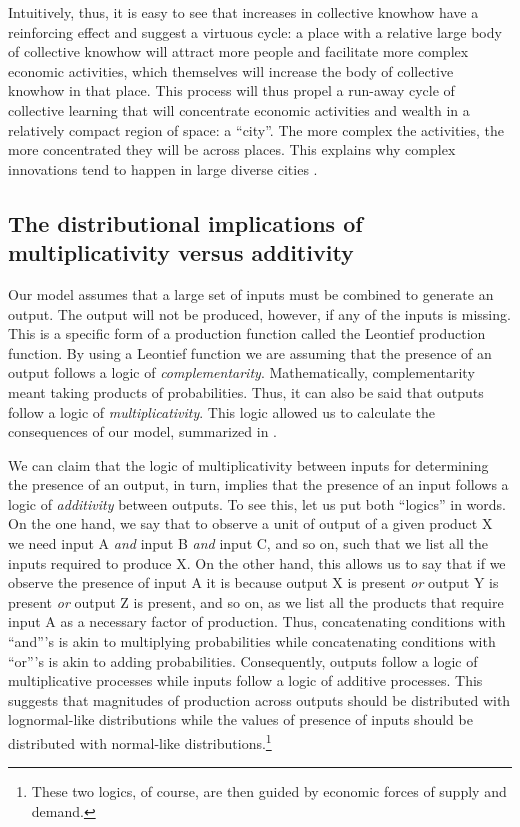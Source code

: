 \documentclass[12pt]{article}
\begin{document}
Intuitively, thus, it is easy to see that increases in collective knowhow have a reinforcing effect and suggest a virtuous cycle: a place with a relative large body of collective knowhow will attract more people and facilitate more complex economic activities, which themselves will increase the body of collective knowhow in that place. This process will thus propel a run-away cycle of collective learning that will concentrate economic activities and wealth in a relatively compact region of space: a ``city''. The more complex the activities, the more concentrated they will be across places. This explains why complex innovations tend to happen in large diverse cities \citep{gomez2016explaining}.


\subsection{The distributional implications of multiplicativity versus additivity}\label{sec_multadd}
Our model assumes that a large set of inputs must be combined to generate an output. The output will not be produced, however, if any of the inputs is missing. This is a specific form of a production function called the Leontief production function. By using a Leontief function we are assuming that the presence of an output follows a logic of \emph{complementarity}. Mathematically, complementarity meant taking products of probabilities. Thus, it can also be said that outputs follow a logic of \emph{multiplicativity}. This logic allowed us to calculate the consequences of our model, summarized in .

We can claim that the logic of multiplicativity between inputs for determining the presence of an output, in turn, implies that the presence of an input follows a logic of \emph{additivity} between outputs. To see this, let us put both ``logics'' in words. On the one hand, we say that to observe a unit of output of a given product X we need input A \emph{and} input B \emph{and} input C, and so on, such that we list all the inputs required to produce X. On the other hand, this allows us to say that if we observe the presence of input A it is because output X is present \emph{or} output Y is present \emph{or} output Z is present, and so on, as we list all the products that require input A as a necessary factor of production. Thus, concatenating conditions with ``and'''s is akin to multiplying probabilities while concatenating conditions with ``or'''s is akin to adding probabilities. Consequently, outputs follow a logic of multiplicative processes while inputs follow a logic of additive processes. This suggests that magnitudes of production across outputs should be distributed with lognormal-like distributions while the values of presence of inputs should be distributed with normal-like distributions.\footnote{These two logics, of course, are then guided by economic forces of supply and demand.} 
\end{document}
